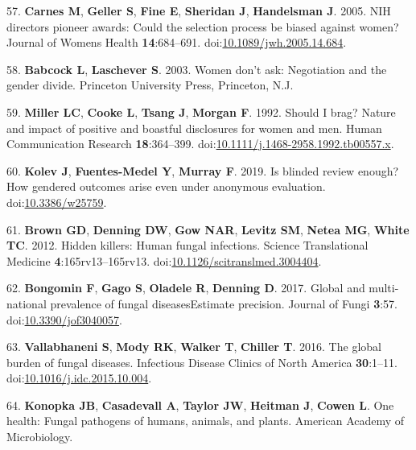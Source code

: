 \documentclass[11pt,]{article}
\begin{document}
\leavevmode\hypertarget{ref-Carnes2005}{}%
57. \textbf{Carnes M}, \textbf{Geller S}, \textbf{Fine E},
\textbf{Sheridan J}, \textbf{Handelsman J}. 2005. NIH directors pioneer
awards: Could the selection process be biased against women? Journal of
Womens Health \textbf{14}:684--691.
doi:\href{https://doi.org/10.1089/jwh.2005.14.684}{10.1089/jwh.2005.14.684}.

\leavevmode\hypertarget{ref-babcock_women_2003}{}%
58. \textbf{Babcock L}, \textbf{Laschever S}. 2003. Women don't ask:
Negotiation and the gender divide. Princeton University Press,
Princeton, N.J.

\leavevmode\hypertarget{ref-MILLER1992}{}%
59. \textbf{Miller LC}, \textbf{Cooke L}, \textbf{Tsang J},
\textbf{Morgan F}. 1992. Should I brag? Nature and impact of positive
and boastful disclosures for women and men. Human Communication Research
\textbf{18}:364--399.
doi:\href{https://doi.org/10.1111/j.1468-2958.1992.tb00557.x}{10.1111/j.1468-2958.1992.tb00557.x}.

\leavevmode\hypertarget{ref-Kolev2019}{}%
60. \textbf{Kolev J}, \textbf{Fuentes-Medel Y}, \textbf{Murray F}. 2019.
Is blinded review enough? How gendered outcomes arise even under
anonymous evaluation.
doi:\href{https://doi.org/10.3386/w25759}{10.3386/w25759}.

\leavevmode\hypertarget{ref-Brown2012}{}%
61. \textbf{Brown GD}, \textbf{Denning DW}, \textbf{Gow NAR},
\textbf{Levitz SM}, \textbf{Netea MG}, \textbf{White TC}. 2012. Hidden
killers: Human fungal infections. Science Translational Medicine
\textbf{4}:165rv13--165rv13.
doi:\href{https://doi.org/10.1126/scitranslmed.3004404}{10.1126/scitranslmed.3004404}.

\leavevmode\hypertarget{ref-Bongomin2017}{}%
62. \textbf{Bongomin F}, \textbf{Gago S}, \textbf{Oladele R},
\textbf{Denning D}. 2017. Global and multi-national prevalence of fungal
diseasesEstimate precision. Journal of Fungi \textbf{3}:57.
doi:\href{https://doi.org/10.3390/jof3040057}{10.3390/jof3040057}.

\leavevmode\hypertarget{ref-Vallabhaneni2016}{}%
63. \textbf{Vallabhaneni S}, \textbf{Mody RK}, \textbf{Walker T},
\textbf{Chiller T}. 2016. The global burden of fungal diseases.
Infectious Disease Clinics of North America \textbf{30}:1--11.
doi:\href{https://doi.org/10.1016/j.idc.2015.10.004}{10.1016/j.idc.2015.10.004}.

\leavevmode\hypertarget{ref-ASM_2019}{}%
64. \textbf{Konopka JB}, \textbf{Casadevall A}, \textbf{Taylor JW},
\textbf{Heitman J}, \textbf{Cowen L}. One health: Fungal pathogens of
humans, animals, and plants. American Academy of Microbiology.
\end{document}
